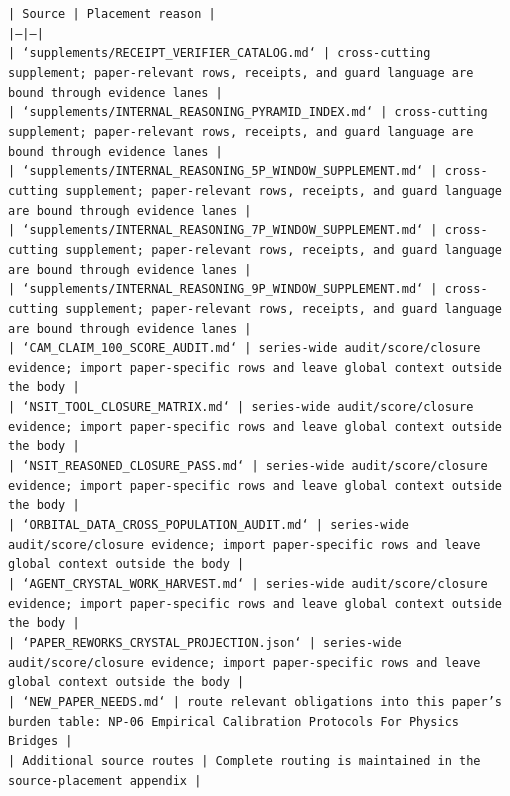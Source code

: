 \documentclass[11pt]{article}
\begin{document}
\noindent\texttt{| Source | Placement reason |}\\
\noindent\texttt{|---|---|}\\
\noindent\texttt{| `supplements/RECEIPT\_VERIFIER\_CATALOG.md` | cross-cutting supplement; paper-relevant rows, receipts, and guard language are bound through evidence lanes |}\\
\noindent\texttt{| `supplements/INTERNAL\_REASONING\_PYRAMID\_INDEX.md` | cross-cutting supplement; paper-relevant rows, receipts, and guard language are bound through evidence lanes |}\\
\noindent\texttt{| `supplements/INTERNAL\_REASONING\_5P\_WINDOW\_SUPPLEMENT.md` | cross-cutting supplement; paper-relevant rows, receipts, and guard language are bound through evidence lanes |}\\
\noindent\texttt{| `supplements/INTERNAL\_REASONING\_7P\_WINDOW\_SUPPLEMENT.md` | cross-cutting supplement; paper-relevant rows, receipts, and guard language are bound through evidence lanes |}\\
\noindent\texttt{| `supplements/INTERNAL\_REASONING\_9P\_WINDOW\_SUPPLEMENT.md` | cross-cutting supplement; paper-relevant rows, receipts, and guard language are bound through evidence lanes |}\\
\noindent\texttt{| `CAM\_CLAIM\_100\_SCORE\_AUDIT.md` | series-wide audit/score/closure evidence; import paper-specific rows and leave global context outside the body |}\\
\noindent\texttt{| `NSIT\_TOOL\_CLOSURE\_MATRIX.md` | series-wide audit/score/closure evidence; import paper-specific rows and leave global context outside the body |}\\
\noindent\texttt{| `NSIT\_REASONED\_CLOSURE\_PASS.md` | series-wide audit/score/closure evidence; import paper-specific rows and leave global context outside the body |}\\
\noindent\texttt{| `ORBITAL\_DATA\_CROSS\_POPULATION\_AUDIT.md` | series-wide audit/score/closure evidence; import paper-specific rows and leave global context outside the body |}\\
\noindent\texttt{| `AGENT\_CRYSTAL\_WORK\_HARVEST.md` | series-wide audit/score/closure evidence; import paper-specific rows and leave global context outside the body |}\\
\noindent\texttt{| `PAPER\_REWORKS\_CRYSTAL\_PROJECTION.json` | series-wide audit/score/closure evidence; import paper-specific rows and leave global context outside the body |}\\
\noindent\texttt{| `NEW\_PAPER\_NEEDS.md` | route relevant obligations into this paper's burden table: NP-06 Empirical Calibration Protocols For Physics Bridges |}\\
\noindent\texttt{| Additional source routes | Complete routing is maintained in the source-placement appendix |}\\
\end{document}
